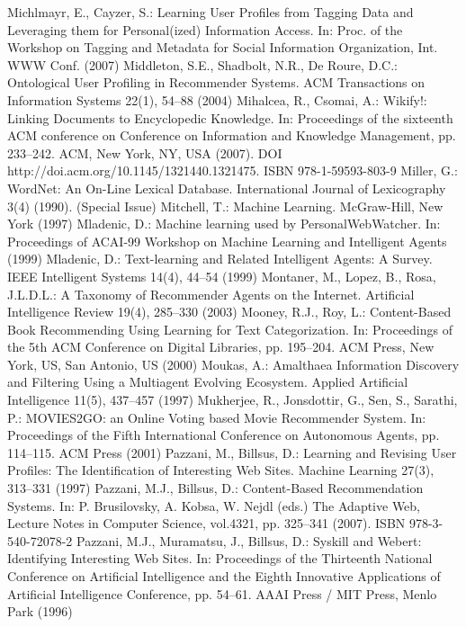 \begin{thebibliography}{110}
Michlmayr, E., Cayzer, S.: Learning User Profiles from Tagging Data and Leveraging them for Personal(ized) Information Access. In: Proc. of the Workshop on Tagging and Metadata for Social Information Organization, Int. WWW Conf. (2007)
Middleton, S.E., Shadbolt, N.R., De Roure, D.C.: Ontological User Profiling in Recommender Systems. ACM Transactions on Information Systems 22(1), 54–88 (2004)
Mihalcea, R., Csomai, A.: Wikify!: Linking Documents to Encyclopedic Knowledge. In: Proceedings of the sixteenth ACM conference on Conference on Information and Knowledge Management, pp. 233–242. ACM, New York, NY, USA (2007). DOI http://doi.acm.org/10.1145/1321440.1321475. ISBN 978-1-59593-803-9
Miller, G.: WordNet: An On-Line Lexical Database. International Journal of Lexicography 3(4) (1990). (Special Issue)
Mitchell, T.: Machine Learning. McGraw-Hill, New York (1997)
Mladenic, D.: Machine learning used by PersonalWebWatcher. In: Proceedings of ACAI-99 Workshop on Machine Learning and Intelligent Agents (1999)
Mladenic, D.: Text-learning and Related Intelligent Agents: A Survey. IEEE Intelligent Systems 14(4), 44–54 (1999)
Montaner, M., Lopez, B., Rosa, J.L.D.L.: A Taxonomy of Recommender Agents on the Internet. Artificial Intelligence Review 19(4), 285–330 (2003)
Mooney, R.J., Roy, L.: Content-Based Book Recommending Using Learning for Text Categorization. In: Proceedings of the 5th ACM Conference on Digital Libraries, pp. 195–204. ACM Press, New York, US, San Antonio, US (2000)
Moukas, A.: Amalthaea Information Discovery and Filtering Using a Multiagent Evolving Ecosystem. Applied Artificial Intelligence 11(5), 437–457 (1997)
Mukherjee, R., Jonsdottir, G., Sen, S., Sarathi, P.: MOVIES2GO: an Online Voting based Movie Recommender System. In: Proceedings of the Fifth International Conference on Autonomous Agents, pp. 114–115. ACM Press (2001)
Pazzani, M., Billsus, D.: Learning and Revising User Profiles: The Identification of Interesting Web Sites. Machine Learning 27(3), 313–331 (1997)
Pazzani, M.J., Billsus, D.: Content-Based Recommendation Systems. In: P. Brusilovsky, A. Kobsa, W. Nejdl (eds.) The Adaptive Web, Lecture Notes in Computer Science, vol.4321, pp. 325–341 (2007). ISBN 978-3-540-72078-2
Pazzani, M.J., Muramatsu, J., Billsus, D.: Syskill and Webert: Identifying Interesting Web Sites. In: Proceedings of the Thirteenth National Conference on Artificial Intelligence and the Eighth Innovative Applications of Artificial Intelligence Conference, pp. 54–61. AAAI Press / MIT Press, Menlo Park (1996)

\end{thebibliography}
